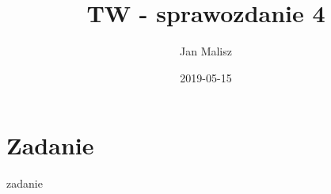 \documentclass[10pt,a4paper]{article}
\title{TW - sprawozdanie 4}
\author{Jan Malisz}
\date{2019-05-15}
\begin{document}
  \maketitle
  \thispagestyle{empty}
  \newpage

  \section*{Zadanie}\label{sec:Zadanie}
  {zadanie}
\end{document}

